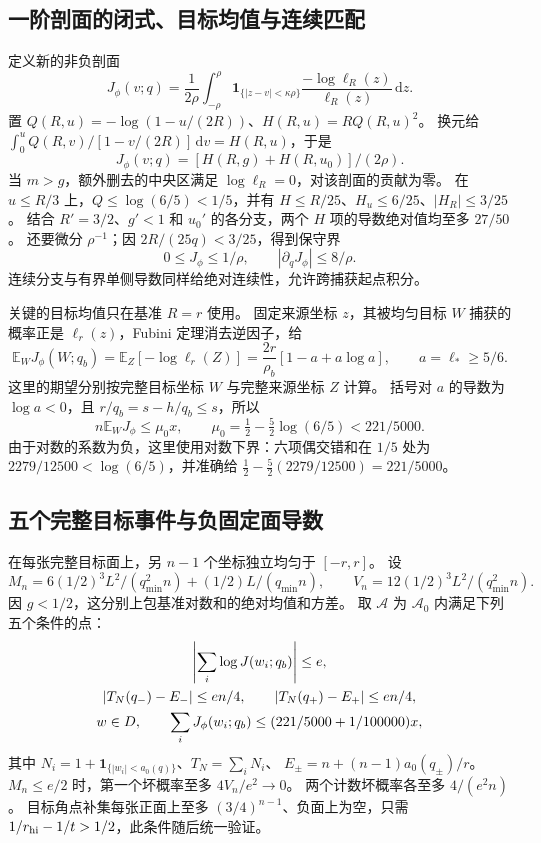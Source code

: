 \documentclass[UTF8,a4paper,11pt,fontset=fandol]{ctexart}
\theoremstyle{remark}
\newcommand{\one}{\mathbf 1}
\newcommand{\dint}{\,\mathrm d}
\begin{document}
\subsection{一阶剖面的闭式、目标均值与连续匹配}\label{subsec:profile-local}
定义新的非负剖面
\[
 J_\phi(v;q)=\frac1{2\rho}\int_{-\rho}^{\rho}
 \one_{\{|z-v|<\kappa\rho\}}
 \frac{-\log\ell_R(z)}{\ell_R(z)}\dint z.
\]
置 $Q(R,u)=-\log(1-u/(2R))$、$H(R,u)=R Q(R,u)^2$。
换元给 $\int_0^u Q(R,v)/[1-v/(2R)]\dint v=H(R,u)$，于是
\begin{equation}\label{eq:Jphi-closed}
 J_\phi(v;q)=[H(R,g)+H(R,u_0)]/(2\rho).
\end{equation}
当 $m>g$，额外删去的中央区满足 $\log\ell_R=0$，对该剖面的贡献为零。
在 $u\le R/3$ 上，$Q\le\log(6/5)<1/5$，并有
$H\le R/25$、$H_u\le6/25$、$|H_R|\le3/25$。
结合 $R'=3/2$、$g'<1$ 和 $u_0'$ 的各分支，两个 $H$ 项的导数绝对值均至多 $27/50$。
还要微分 $\rho^{-1}$；因 $2R/(25q)<3/25$，得到保守界
\begin{equation}\label{eq:Jphi-derivative}
 0\le J_\phi\le1/\rho,\qquad|\partial_qJ_\phi|\le8/\rho.
\end{equation}
连续分支与有界单侧导数同样给绝对连续性，允许跨捕获起点积分。

关键的目标均值只在基准 $R=r$ 使用。
固定来源坐标 $z$，其被均匀目标 $W$ 捕获的概率正是 $\ell_r(z)$，Fubini 定理消去逆因子，给
\begin{equation}\label{eq:profile-Fubini}
 \mathbb E_WJ_\phi(W;q_b)=\mathbb E_Z[-\log\ell_r(Z)]
 =\frac{2r}{\rho_b}[1-a+a\log a],\qquad a=\ell_*\ge5/6.
\end{equation}
这里的期望分别按完整目标坐标 $W$ 与完整来源坐标 $Z$ 计算。
括号对 $a$ 的导数为 $\log a<0$，且 $r/q_b=s-h/q_b\le s$，所以
\[
 n\mathbb E_WJ_\phi\le\mu_0x,\qquad
 \mu_0=\tfrac12-\tfrac52\log(6/5)<221/5000.
\]
由于对数的系数为负，这里使用对数下界：六项偶交错和在 $1/5$ 处为
$2279/12500<\log(6/5)$，并准确给 $\frac12-\frac52(2279/12500)=221/5000$。

\subsection{五个完整目标事件与负固定面导数}\label{subsec:profile-targets}
在每张完整目标面上，另 $n-1$ 个坐标独立均匀于 $[-r,r]$。
设
\[
 M_n=6(1/2)^3L^2/(q_{\min}^2n)+(1/2)L/(q_{\min}n),\qquad
 V_n=12(1/2)^3L^2/(q_{\min}^2n).
\]
因 $g<1/2$，这分别上包基准对数和的绝对均值和方差。
取 $\mathcal A$ 为 $\mathcal A_0$ 内满足下列五个条件的点：
\begin{gather}
 \left|\sum_i\log J(w_i;q_b)\right|\le e,\notag\\
 |T_N(q_-)-E_-|\le en/4,\qquad |T_N(q_+)-E_+|\le en/4,\notag\\
 w\in D,\qquad\sum_iJ_\phi(w_i;q_b)\le(221/5000+1/100000)x,
 \label{eq:profile-target-events}
\end{gather}
其中 $N_i=1+\one_{\{|w_i|<a_0(q)\}}$、$T_N=\sum_iN_i$、
$E_\pm=n+(n-1)a_0(q_\pm)/r$。
$M_n\le e/2$ 时，第一个坏概率至多 $4V_n/e^2\to0$。
两个计数坏概率各至多 $4/(e^2n)$。
目标角点补集每张正面上至多 $(3/4)^{n-1}$、负面上为空，只需 $1/r_{\rm hi}-1/t>1/2$，此条件随后统一验证。
\end{document}
